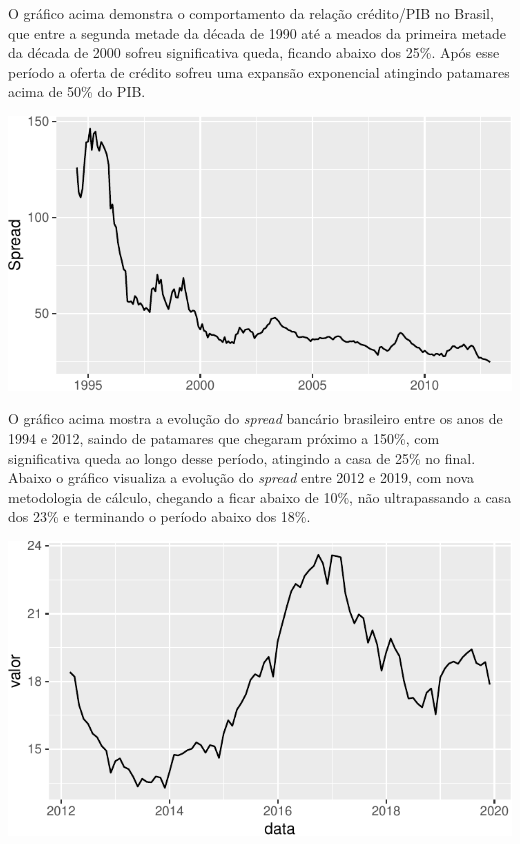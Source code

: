 \documentclass[12pt,openright,oneside,a4paper,chapter=TITLE,section=TITLE,subsection=Title,english,french,spanish,portugues,sumario=tradicional]{04-class-files/abntex2}
\begin{document}
\label{fig:credgdp}

O gráfico acima demonstra o comportamento da relação crédito/PIB no Brasil, que entre a segunda metade da década de 1990 até a meados da primeira metade da década de 2000 sofreu significativa queda, ficando abaixo dos 25\%. Após esse período a oferta de crédito sofreu uma expansão exponencial atingindo patamares acima de 50\% do PIB.


\begin{center}\includegraphics{12-exportedfigures/average spread-1} \end{center}

\label{fig:spread2012}

O gráfico acima mostra a evolução do \emph{spread} bancário brasileiro entre os anos de 1994 e 2012, saindo de patamares que chegaram próximo a 150\%, com significativa queda ao longo desse período, atingindo a casa de 25\% no final. Abaixo o gráfico visualiza a evolução do \emph{spread} entre 2012 e 2019, com nova metodologia de cálculo, chegando a ficar abaixo de 10\%, não ultrapassando a casa dos 23\% e terminando o período abaixo dos 18\%.


\begin{center}\includegraphics{12-exportedfigures/spread 2019-1} \end{center}
\end{document}
